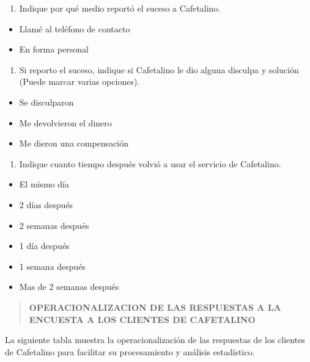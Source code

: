 \begin{enumerate}
\def\labelenumi{\arabic{enumi}.}
\setcounter{enumi}{6}
\item
  Indique por qué medio reportó el suceso a Cafetalino.
\end{enumerate}

\begin{itemize}[label=$\square$,itemsep=1pt,leftmargin=3em]
\item Llamé al teléfono de contacto
\item En forma personal
\end{itemize}

\begin{enumerate}
\def\labelenumi{\arabic{enumi}.}
\setcounter{enumi}{7}
\item
  Si reporto el suceso, indique si Cafetalino le dio alguna disculpa y solución (Puede marcar varias opciones).
\end{enumerate}

\begin{itemize}[label=$\square$,itemsep=1pt,leftmargin=3em]
\item Se disculparon
\item Me devolvieron el dinero
\item Me dieron una compensación
\end{itemize}

\begin{enumerate}
\def\labelenumi{\arabic{enumi}.}
\setcounter{enumi}{8}
\item
  Indique cuanto tiempo después volvió a usar el servicio de Cafetalino.
\end{enumerate}

\begin{itemize}[label=$\square$,itemsep=1pt,leftmargin=3em]
\item El mismo día
\item 2 días después
\item 2 semanas después
\item 1 día después
\item 1 semana después
\item Mas de 2 semanas después
\end{itemize}

\begin{quote}
\textbf{OPERACIONALIZACION DE LAS RESPUESTAS A LA ENCUESTA A LOS CLIENTES DE CAFETALINO}
\end{quote}

La siguiente tabla muestra la operacionalización de las respuestas de los clientes de Cafetalino para facilitar su procesamiento y análisis estadístico.

